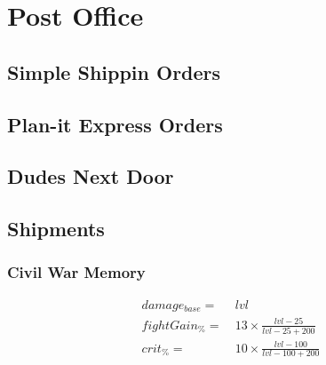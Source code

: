 \chapter{Post Office}
    \section{Simple Shippin Orders}
        \todo{}

    \section{Plan-it Express Orders}
        \todo{}

    \section{Dudes Next Door}
        \todo{}

    \newpage
    \section{Shipments}
    \begin{center}
    \end{center}
    \subsection{Civil War Memory}

        \begin{align*}
            damage_{base} = &\  lvl
            \\
            fightGain_\% = &\   13 \times \frac{{lvl}-25}{{lvl}-25+200}
            \\
            crit_\% = &\  10 \times \frac{{lvl}-100}{{lvl}-100+200}
        \end{align*}

